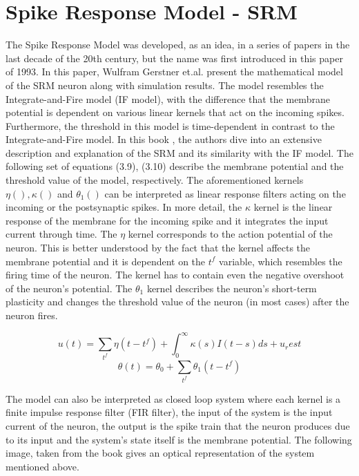 \documentclass[12pt]{report}
\begin{document}
\section{Spike Response Model - SRM}
The Spike Response Model was developed, as an idea, in a series of papers in the last decade of the 20th century, but the name was first introduced in this paper \cite{Gerstner1993} of 1993. In this paper, Wulfram Gerstner et.al. present the mathematical model of the SRM neuron along with simulation results. The model resembles the Integrate-and-Fire model (IF model), with the difference that the membrane potential is dependent on various linear kernels that act on the incoming spikes. Furthermore, the threshold in this model is time-dependent in contrast to the Integrate-and-Fire model. In this book \cite{gerstner2014}, the authors dive into an extensive description and explanation of the SRM and its similarity with the IF model. The following set of equations (3.9), (3.10) describe the membrane potential and the threshold value of the model, respectively. The aforementioned kernels \(\eta(), \kappa()\) and \(\theta_1()\) can be interpreted as linear response filters acting on the incoming or the postsynaptic spikes. In more detail, the \(\kappa\) kernel is the linear response of the membrane for the incoming spike and it integrates the input current through time. The \(\eta\) kernel corresponds to the action potential of the neuron. This is better understood by the fact that the kernel affects the membrane potential and it is dependent on the \(t^f\) variable, which resembles the firing time of the neuron. The kernel has to contain even the negative overshoot of the neuron's potential. The \(\theta_1\) kernel describes the neuron's short-term plasticity and changes the threshold value of the neuron (in most cases) after the neuron fires.

\begin{equation}
u(t) = \sum_{t^f}\eta(t-t^f)+\int_0^\infty\kappa(s)I(t-s)ds+u_rest
\end{equation}
\begin{equation}
\theta(t) = \theta_0 + \sum_{t^f}\theta_1(t-t^f)
\end{equation}

The model can also be interpreted as closed loop system where each kernel is a finite impulse response filter (FIR filter), the input of the system is the input current of the neuron, the output is the spike train that the neuron produces due to its input and the system's state itself is the membrane potential. The following image, taken from the book \cite{gerstner2014} gives an optical representation of the system mentioned above.
\end{document}
